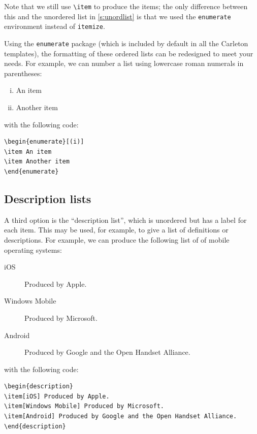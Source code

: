 \documentclass{article}
\newcommand*{\code}[1]{\texttt{#1}}
\begin{document}
Note that we still use \code{\textbackslash{}item} to produce the items; the only difference between this and the unordered list in \cref{s:unordlist} is that we used the \code{enumerate} environment instead of \code{itemize}.

Using the \code{enumerate} package (which is included by default in all the Carleton templates), the formatting of these ordered lists can be redesigned to meet your needs.
For example, we can number a list using lowercase roman numerals in parentheses:
\begin{enumerate}[(i)]
\item An item
\item Another item
\end{enumerate}
with the following code:
\begin{verbatim}
\begin{enumerate}[(i)]
\item An item
\item Another item
\end{enumerate}
\end{verbatim}

\subsection{Description lists}
\label{s:desclists}
A third option is the \enquote{description list}, which is unordered but has a label for each item.
This may be used, for example, to give a list of definitions or descriptions.
For example, we can produce the following list of of mobile operating systems:
\begin{description}
\item[iOS] Produced by Apple.
\item[Windows Mobile] Produced by Microsoft.
\item[Android] Produced by Google and the Open Handset Alliance.
\end{description}
with the following code:
\begin{verbatim}
\begin{description}
\item[iOS] Produced by Apple.
\item[Windows Mobile] Produced by Microsoft.
\item[Android] Produced by Google and the Open Handset Alliance.
\end{description}
\end{verbatim}
\end{document}
